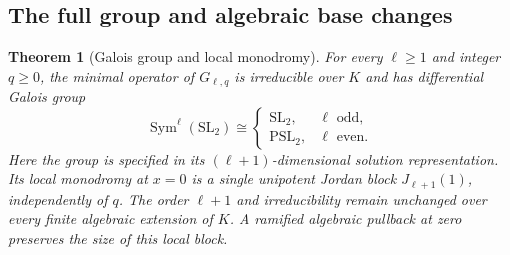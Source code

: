 \documentclass[11pt,a4paper]{article}
\newtheorem{theorem}{Theorem}[section]
\theoremstyle{definition}
\theoremstyle{remark}
\numberwithin{equation}{section}
\begin{document}
\subsection{The full group and algebraic base changes}

\begin{theorem}[Galois group and local monodromy]
\label{B:bv:galois}
For every $\ell\ge1$ and integer $q\ge0$, the minimal operator of
$G_{\ell,q}$ is irreducible over $K$ and has differential Galois group
\[
 \operatorname{Sym}^{\ell}(\mathrm{SL}_2)
 \cong
 \begin{cases}
  \mathrm{SL}_2,&\ell\text{ odd},\\
  \mathrm{PSL}_2,&\ell\text{ even}.
 \end{cases}
\]
Here the group is specified in its $(\ell+1)$-dimensional solution
representation. Its local monodromy at $x=0$ is a single unipotent
Jordan block $J_{\ell+1}(1)$, independently of $q$.
The order $\ell+1$ and irreducibility remain unchanged over every
finite algebraic extension of $K$. A ramified algebraic pullback at
zero preserves the size of this local block.
\end{theorem}
\end{document}

